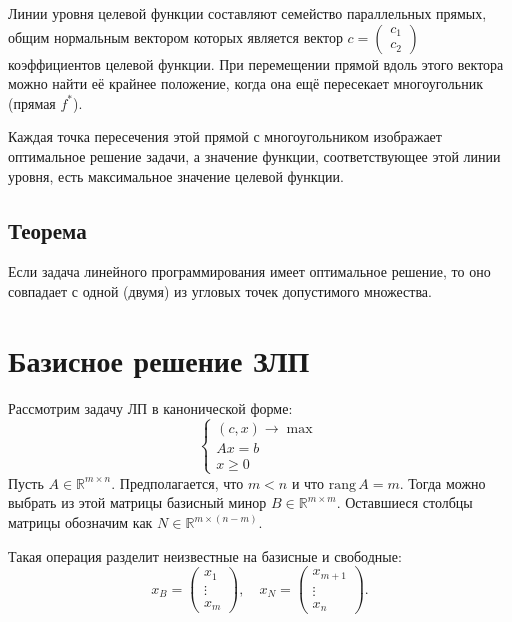 \documentclass[17pt]{extarticle}
\begin{document}
Линии уровня целевой функции составляют семейство параллельных прямых, общим нормальным вектором которых является вектор \( c = \begin{pmatrix} c_1 \\ c_2 \end{pmatrix} \) коэффициентов целевой функции. При перемещении прямой вдоль этого вектора можно найти её крайнее положение, когда она ещё пересекает многоугольник (прямая \( f^* \)).

Каждая точка пересечения этой прямой с многоугольником изображает оптимальное решение задачи, а значение функции, соответствующее этой линии уровня, есть максимальное значение целевой функции.

\subsection{Теорема}
\begin{theorem}
    Если задача линейного программирования имеет оптимальное решение, то оно совпадает с одной (двумя) из угловых точек допустимого множества.
\end{theorem}




\section{Базисное решение ЗЛП}

Рассмотрим задачу ЛП в канонической форме:
\[
    \begin{cases}
        (c, x) \to \max \\
        A x = b         \\
        x \ge 0
    \end{cases}
\]
Пусть \( A \in \mathbb{R}^{m \times n} \). Предполагается, что \( m < n \) и что \( \text{rang}\, A = m \). Тогда можно выбрать из этой матрицы базисный минор \( B \in \mathbb{R}^{m \times m} \). Оставшиеся столбцы матрицы обозначим как \( N \in \mathbb{R}^{m \times (n - m)} \).

Такая операция разделит неизвестные на базисные и свободные:
\[
    x_B = \begin{pmatrix} x_1 \\ \vdots \\ x_m \end{pmatrix}, \quad
    x_N = \begin{pmatrix} x_{m+1} \\ \vdots \\ x_n \end{pmatrix}.
\]
\end{document}

